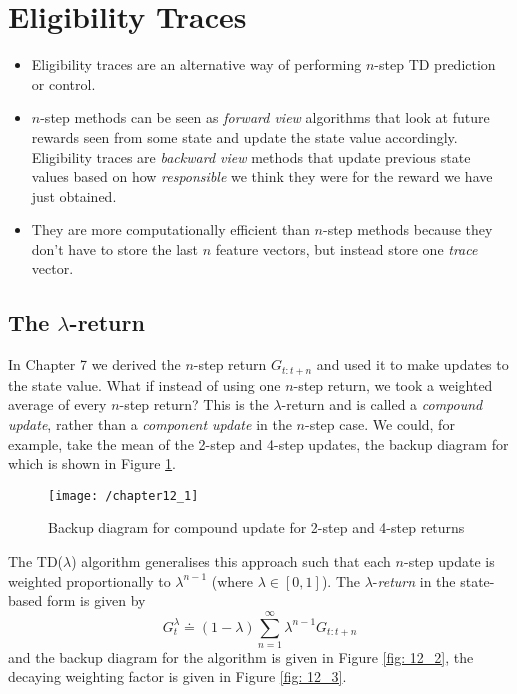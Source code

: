 \section{Eligibility Traces}
\begin{itemize}
	\item Eligibility traces are an alternative way of performing $n$-step TD prediction or control.
	\item $n$-step methods can be seen as \textit{forward view} algorithms that look at future rewards seen from some state and update the state value accordingly. Eligibility traces are \textit{backward view} methods that update previous state values based on how \textit{responsible} we think they were for the reward we have just obtained.
	\item They are more computationally efficient than $n$-step methods because they don't have to store the last $n$ feature vectors, but instead store one  \textit{trace} vector.
\end{itemize}

\subsection{The $\lambda$-return}
In Chapter 7 we derived the $n$-step return $G_{t:t+n}$ and used it to make updates to the state value. What if instead of using one $n$-step return, we took a weighted average of every $n$-step return? This is the $\lambda$-return and is called a \textit{compound update}, rather than a \textit{component update} in the $n$-step case. We could, for example, take the mean of the 2-step and 4-step updates, the backup diagram for which is shown in Figure \ref{fig: 12_1}.
\begin{figure}[h!]
	\centering
	\texttt{[image: /chapter12\_1]}
	\caption{Backup diagram for compound update for 2-step and 4-step returns}
	\label{fig: 12_1}
\end{figure}

The TD($\lambda$) algorithm generalises this approach such that each $n$-step update is weighted proportionally to $\lambda^{n-1}$ (where $\lambda \in [0, 1]$). The $\lambda$-\textit{return} in the state-based form is given by
\begin{equation} \label{eq: lambda return}
G_t^\lambda \doteq (1-\lambda) \sum_{n=1}^{\infty} \lambda^{n-1}G_{t:t+n}
\end{equation}
and the backup diagram for the algorithm is given in Figure \ref{fig: 12_2}, the decaying weighting factor is given in Figure \ref{fig: 12_3}.


